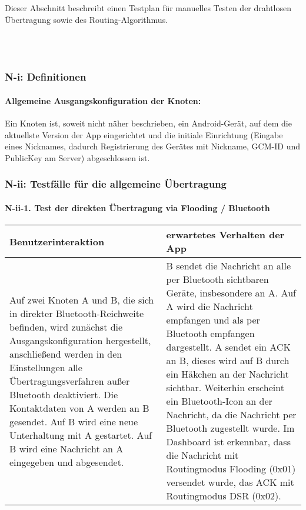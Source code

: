 
Dieser Abschnitt beschreibt einen Testplan für manuelles Testen der
drahtlosen Übertragung sowie des Routing-Algorithmus.

\\\\


\subsubsection{N-i: Definitionen}\label{i-definitionen}

\paragraph{Allgemeine Ausgangskonfiguration der
Knoten:}\label{allgemeine-ausgangskonfiguration-der-knoten}

Ein Knoten ist, soweit nicht näher beschrieben, ein Android-Gerät, auf
dem die aktuellste Version der App eingerichtet und die initiale
Einrichtung (Eingabe eines Nicknames, dadurch Registrierung des Gerätes
mit Nickname, GCM-ID und PublicKey am Server) abgeschlossen ist.



\clearpage
\subsubsection{N-ii: Testfälle für die allgemeine
Übertragung}\label{ii-testfuxe4lle-fuxfcr-die-allgemeine-uxfcbertragung}

\paragraph{N-ii-1. Test der direkten Übertragung via Flooding /
Bluetooth}\label{test-der-direkten-uxfcbertragung-via-flooding-bluetooth}

\begin{longtable}{p{8cm}p{8.5cm}}
\toprule
Benutzerinteraktion & erwartetes Verhalten der App\tabularnewline
\midrule
\endhead
Auf zwei Knoten A und B, die sich in direkter Bluetooth-Reichweite
befinden, wird zunächst die Ausgangskonfiguration hergestellt,
anschließend werden in den Einstellungen alle Übertragungsverfahren
außer Bluetooth deaktiviert. Die Kontaktdaten von A werden an B
gesendet. Auf B wird eine neue Unterhaltung mit A gestartet. Auf B wird
eine Nachricht an A eingegeben und abgesendet. & B sendet die Nachricht
an alle per Bluetooth sichtbaren Geräte, insbesondere an A. Auf A wird
die Nachricht empfangen und als per Bluetooth empfangen dargestellt. A
sendet ein ACK an B, dieses wird auf B durch ein Häkchen an der
Nachricht sichtbar. Weiterhin erscheint ein Bluetooth-Icon an der
Nachricht, da die Nachricht per Bluetooth zugestellt wurde. Im Dashboard
ist erkennbar, dass die Nachricht mit Routingmodus Flooding (0x01)
versendet wurde, das ACK mit Routingmodus DSR (0x02).\tabularnewline
\bottomrule
\end{longtable}

